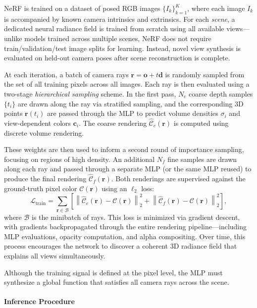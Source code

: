 NeRF is trained on a dataset of posed RGB images \( \{ I_k \}_{k=1}^K \), where each image \( I_k \) is accompanied by known camera intrinsics and extrinsics. For each \emph{scene}, a dedicated neural radiance field is trained from scratch using all available views—unlike models trained across multiple scenes, NeRF does not require train/validation/test image splits for learning. Instead, novel view synthesis is evaluated on held-out camera poses after scene reconstruction is complete.

At each iteration, a batch of camera rays \( \mathbf{r} = \mathbf{o} + t\mathbf{d} \) is randomly sampled from the set of all training pixels across all images. Each ray is then evaluated using a two-stage \emph{hierarchical sampling} scheme. In the first pass, \( N_c \) coarse depth samples \( \{ t_i \} \) are drawn along the ray via stratified sampling, and the corresponding 3D points \( \mathbf{r}(t_i) \) are passed through the MLP to predict volume densities \( \sigma_i \) and view-dependent colors \( \mathbf{c}_i \). The coarse rendering \( \hat{\mathcal{C}}_c(\mathbf{r}) \) is computed using discrete volume rendering.

These weights are then used to inform a second round of importance sampling, focusing on regions of high density. An additional \( N_f \) fine samples are drawn along each ray and passed through a separate MLP (or the same MLP reused) to produce the final rendering \( \hat{\mathcal{C}}_f(\mathbf{r}) \). Both renderings are supervised against the ground-truth pixel color \( \mathcal{C}(\mathbf{r}) \) using an \(\ell_2\) loss:
\[
\mathcal{L}_{\text{train}} =
\sum_{\mathbf{r} \in \mathcal{B}}
\left[
\left\| \hat{\mathcal{C}}_c(\mathbf{r}) - \mathcal{C}(\mathbf{r}) \right\|_2^2
+
\left\| \hat{\mathcal{C}}_f(\mathbf{r}) - \mathcal{C}(\mathbf{r}) \right\|_2^2
\right],
\]
where \( \mathcal{B} \) is the minibatch of rays. This loss is minimized via gradient descent, with gradients backpropagated through the entire rendering pipeline—including MLP evaluations, opacity computation, and alpha compositing. Over time, this process encourages the network to discover a coherent 3D radiance field that explains all views simultaneously.

Although the training signal is defined at the pixel level, the MLP must synthesize a global function that satisfies all camera rays across the scene. 

\newpage

\paragraph{Inference Procedure}

